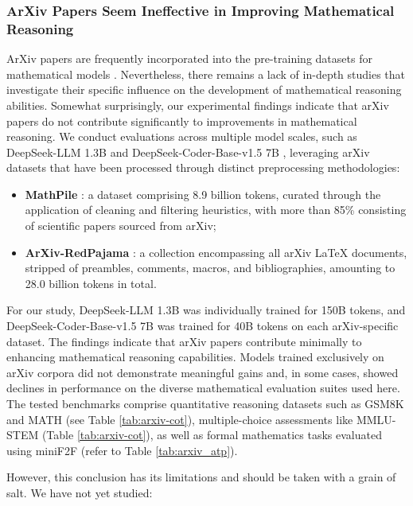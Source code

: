 \begin{itemize}[topsep=0pt]
\begin{itemize}[topsep=0pt]
\subsubsection{ArXiv Papers Seem Ineffective in Improving Mathematical Reasoning}

ArXiv papers are frequently incorporated into the pre-training datasets for mathematical models \citep{minerva,gpt-f,llemma,mathpile}. Nevertheless, there remains a lack of in-depth studies that investigate their specific influence on the development of mathematical reasoning abilities. Somewhat surprisingly, our experimental findings indicate that arXiv papers do not contribute significantly to improvements in mathematical reasoning. We conduct evaluations across multiple model scales, such as DeepSeek-LLM 1.3B and DeepSeek-Coder-Base-v1.5 7B \citep{deepseek-coder}, leveraging arXiv datasets that have been processed through distinct preprocessing methodologies:

\begin{itemize}[topsep=0pt]
    \item \textbf{MathPile} \citep{mathpile}: a dataset comprising 8.9 billion tokens, curated through the application of cleaning and filtering heuristics, with more than 85\% consisting of scientific papers sourced from arXiv;
    \item \textbf{ArXiv-RedPajama} \citep{redpajama}: a collection encompassing all arXiv LaTeX documents, stripped of preambles, comments, macros, and bibliographies, amounting to 28.0 billion tokens in total.
\end{itemize}

For our study, DeepSeek-LLM 1.3B was individually trained for 150B tokens, and DeepSeek-Coder-Base-v1.5 7B was trained for 40B tokens on each arXiv-specific dataset. The findings indicate that arXiv papers contribute minimally to enhancing mathematical reasoning capabilities. Models trained exclusively on arXiv corpora did not demonstrate meaningful gains and, in some cases, showed declines in performance on the diverse mathematical evaluation suites used here. The tested benchmarks comprise quantitative reasoning datasets such as GSM8K and MATH (see Table \ref{tab:arxiv-cot}), multiple-choice assessments like MMLU-STEM (Table \ref{tab:arxiv-cot}), as well as formal mathematics tasks evaluated using miniF2F (refer to Table \ref{tab:arxiv_atp}).

However, this conclusion has its limitations and should be taken with a grain of salt. We have not yet studied:


\end{itemize}
\end{itemize}
